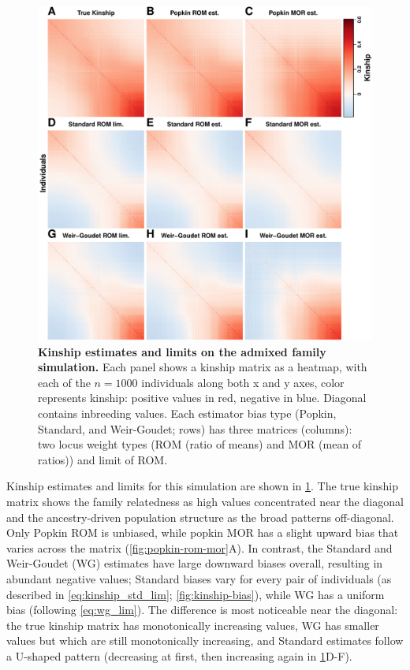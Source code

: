\documentclass[11pt]{article}
\begin{document}
\begin{linenumbers}
\begin{figure}[bp!]
  \centering
  \includegraphics[height=0.8\textheight]{sim-admix-n1000-m100000-k3-f0.3-s0.5-mc100-h0.8-g20-fes/kinship.pdf}
  \caption{
    {\bf Kinship estimates and limits on the admixed family simulation.}
    Each panel shows a kinship matrix as a heatmap, with each of the $n=1000$ individuals along both x and y axes, color represents kinship: positive values in red, negative in blue.
    Diagonal contains inbreeding values.
    Each estimator bias type (Popkin, Standard, and Weir-Goudet; rows) has three matrices (columns): two locus weight types (ROM (ratio of means) and MOR (mean of ratios)) and limit of ROM.
  }
  \label{fig:kinship_sim}
\end{figure}

Kinship estimates and limits for this simulation are shown in \cref{fig:kinship_sim}.
The true kinship matrix shows the family relatedness as high values concentrated near the diagonal and the ancestry-driven population structure as the broad patterns off-diagonal.
Only Popkin ROM is unbiased, while popkin MOR has a slight upward bias that varies across the matrix (\cref{fig:popkin-rom-mor}A).
In contrast, the Standard and Weir-Goudet (WG) estimates have large downward biases overall, resulting in abundant negative values; Standard biases vary for every pair of individuals (as described in \cref{eq:kinship_std_lim}; \cref{fig:kinship-bias}), while WG has a uniform bias (following \cref{eq:wg_lim}).
The difference is most noticeable near the diagonal: the true kinship matrix has monotonically increasing values, WG has smaller values but which are still monotonically increasing, and Standard estimates follow a U-shaped pattern (decreasing at first, then increasing again in \cref{fig:kinship_sim}D-F).


\end{linenumbers}
\end{document}
